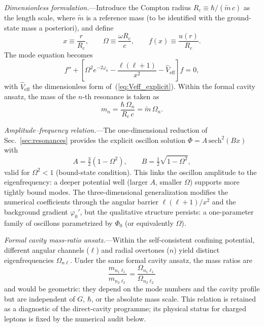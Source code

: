 \documentclass[aps,prd,onecolumn,superscriptaddress,nofootinbib,showpacs,12pt,notitlepage]{revtex4-2}
\begin{document}
\textit{Dimensionless formulation.}---Introduce the
Compton radius $R_c \equiv \hbar/(\tilde{m}\,c)$ as the
length scale, where $\tilde{m}$ is a reference mass (to
be identified with the ground-state mass a posteriori),
and define
\begin{equation}\label{eq:dimless_vars}
  x \equiv \frac{r}{R_c},\qquad
  \Omega \equiv \frac{\omega R_c}{c},\qquad
  f(x) \equiv \frac{u(r)}{R_c}.
\end{equation}
The mode equation becomes
\begin{equation}\label{eq:dimless_mode}
  f'' + \left[\Omega^2 e^{-2\varphi_0}
    - \frac{\ell(\ell+1)}{x^2}
    - \hat{V}_{\mathrm{eff}}\right]f = 0,
\end{equation}
with $\hat{V}_{\mathrm{eff}}$ the dimensionless form
of~(\ref{eq:Veff_explicit}).  Within the formal cavity
ansatz, the mass of the $n$-th resonance is taken as
\begin{equation}\label{eq:mass_from_omega}
  m_n = \frac{\hbar\,\Omega_n}{R_c\,c}
  = \tilde{m}\,\Omega_n.
\end{equation}

\textit{Amplitude--frequency relation.}---The
one-dimensional reduction of
Sec.~\ref{sec:resonances} provides the explicit oscillon
solution $\Phi = A\,\mathrm{sech}^2(Bx)$ with
\begin{equation}\label{eq:A_Omega}
  A = \tfrac{3}{2}(1 - \Omega^2),\qquad
  B = \tfrac{1}{2}\sqrt{1 - \Omega^2},
\end{equation}
valid for $\Omega^2 < 1$ (bound-state condition).  This
links the oscillon amplitude to the eigenfrequency: a
deeper potential well (larger $A$, smaller $\Omega$)
supports more tightly bound modes.  The three-dimensional
generalization modifies the numerical coefficients through
the angular barrier $\ell(\ell+1)/x^2$ and the background
gradient $\varphi_0'$, but the qualitative
structure persists: a one-parameter family of oscillons
parametrized by $\Phi_0$ (or equivalently $\Omega$).

\textit{Formal cavity mass-ratio ansatz.}---Within
the self-consistent confining potential, different angular
channels ($\ell$) and radial overtones ($n$) yield
distinct eigenfrequencies $\Omega_{n\ell}$.  Under the same
formal cavity ansatz, the mass ratios are
\begin{equation}\label{eq:mass_ratios}
  \frac{m_{n_1\ell_1}}{m_{n_2\ell_2}}
  = \frac{\Omega_{n_1\ell_1}}{\Omega_{n_2\ell_2}}
\end{equation}
and would be geometric: they depend on the mode numbers
and the cavity profile but are independent of $G$, $\hbar$,
or the absolute mass scale.  This relation is retained as
a diagnostic of the direct-cavity programme; its physical
status for charged leptons is fixed by the numerical audit
below.
\end{document}
